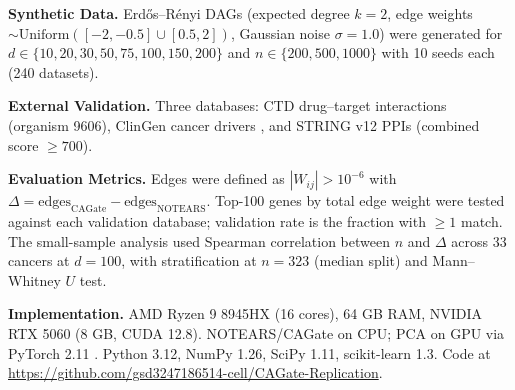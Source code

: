 \documentclass[12pt,a4paper]{article}
\begin{document}
\noindent\textbf{Synthetic Data.} Erd\H{o}s--R\'{e}nyi DAGs (expected degree $k=2$, edge weights $\sim \text{Uniform}([-2,-0.5] \cup [0.5,2])$, Gaussian noise $\sigma=1.0$) were generated for $d \in \{10, 20, 30, 50, 75, 100, 150, 200\}$ and $n \in \{200, 500, 1000\}$ with 10 seeds each (240 datasets).









\noindent\textbf{External Validation.} Three databases: CTD drug--target interactions \cite{Davis2021} (organism 9606), ClinGen cancer drivers \cite{Rehm2015}, and STRING v12 PPIs \cite{Szklarczyk2023} (combined score $\geq 700$).









\noindent\textbf{Evaluation Metrics.} Edges were defined as $|W_{ij}| > 10^{-6}$ with $\Delta = \text{edges}_{\text{CAGate}} - \text{edges}_{\text{NOTEARS}}$. Top-100 genes by total edge weight were tested against each validation database; validation rate is the fraction with $\geq 1$ match. The small-sample analysis used Spearman correlation between $n$ and $\Delta$ across 33 cancers at $d=100$, with stratification at $n=323$ (median split) and Mann--Whitney $U$ test.









\noindent\textbf{Implementation.} AMD Ryzen 9 8945HX (16 cores), 64 GB RAM, NVIDIA RTX 5060 (8 GB, CUDA 12.8). NOTEARS/CAGate on CPU; PCA on GPU via PyTorch 2.11 \cite{Paszke2019}. Python 3.12, NumPy 1.26, SciPy 1.11, scikit-learn 1.3. Code at \url{https://github.com/gsd3247186514-cell/CAGate-Replication}.
\end{document}
